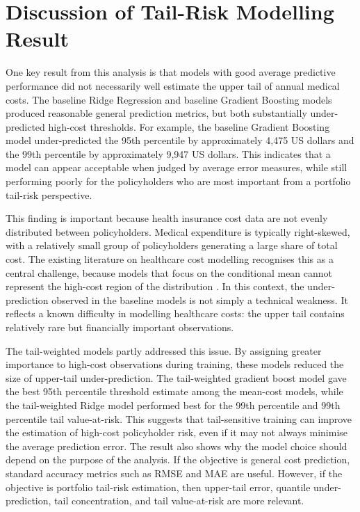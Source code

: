 \documentclass[11pt]{article}
\begin{document}
\section*{Discussion of Tail-Risk Modelling Result}

One key result from this analysis is that models with good average predictive performance did not necessarily well estimate the upper tail of annual medical costs. The baseline Ridge Regression and baseline Gradient Boosting models produced reasonable general prediction metrics, but both substantially under-predicted high-cost thresholds. For example, the baseline Gradient Boosting model under-predicted the 95th percentile by approximately 4,475 US dollars and the 99th percentile by approximately 9,947 US dollars. This indicates that a model can appear acceptable when judged by average error measures, while still performing poorly for the policyholders who are most important from a portfolio tail-risk perspective.

This finding is important because health insurance cost data are not evenly distributed between policyholders. Medical expenditure is typically right-skewed, with a relatively small group of policyholders generating a large share of total cost. The existing literature on healthcare cost modelling recognises this as a central challenge, because models that focus on the conditional mean cannot represent the high-cost region of the distribution \citep{malehi2015healthcare_costs}. In this context, the under-prediction observed in the baseline models is not simply a technical weakness. It reflects a known difficulty in modelling healthcare costs: the upper tail contains relatively rare but financially important observations.

The tail-weighted models partly addressed this issue. By assigning greater importance to high-cost observations during training, these models reduced the size of upper-tail under-prediction. The tail-weighted gradient boost model gave the best 95th percentile threshold estimate among the mean-cost models, while the tail-weighted Ridge model performed best for the 99th percentile and 99th percentile tail value-at-risk. This suggests that tail-sensitive training can improve the estimation of high-cost policyholder risk, even if it may not always minimise the average prediction error. The result also shows why the model choice should depend on the purpose of the analysis. If the objective is general cost prediction, standard accuracy metrics such as RMSE and MAE are useful. However, if the objective is portfolio tail-risk estimation, then upper-tail error, quantile under-prediction, tail concentration, and tail value-at-risk are more relevant.
\end{document}
